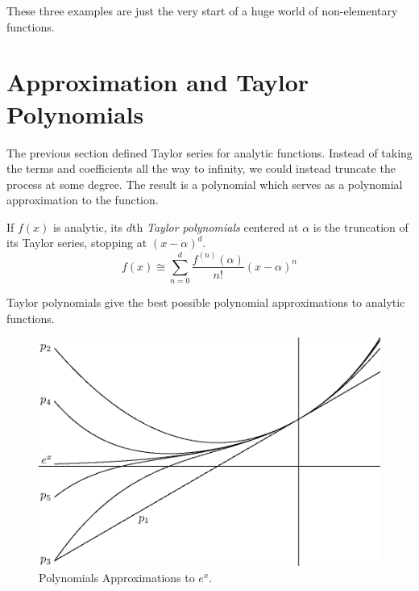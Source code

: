 \documentclass[fleqn]{report}
\begin{document}
These three examples are just the very start of a huge world
of non-elementary functions.

\section{Approximation and Taylor Polynomials}
\label{approximation}

The previous section defined Taylor series for analytic
functions. Instead of taking the terms and coefficients all
the way to infinity, we could instead truncate the process at
some degree. The result is a polynomial which serves as a
polynomial approximation to the function. 

\begin{defn}
If $f(x)$ is analytic, its $d$th \emph{Taylor polynomials}
centered at $\alpha$ is the truncation of its Taylor series,
stopping at $(x-\alpha)^d$. 
\begin{equation*}
f(x) \cong \sum_{n=0}^d \frac{f^{(n)}(\alpha)}{n!} (x-\alpha)^n
\end{equation*}
\end{defn}

Taylor polynomials give the best possible polynomial
approximations to analytic functions.

\begin{figure}[ht]
\centering
\includegraphics[width=12cm]{figure28.eps}
\caption{Polynomials Approximations to $e^x$.}
\label{figure-exponential-approximations}
\end{figure}
\end{document}
